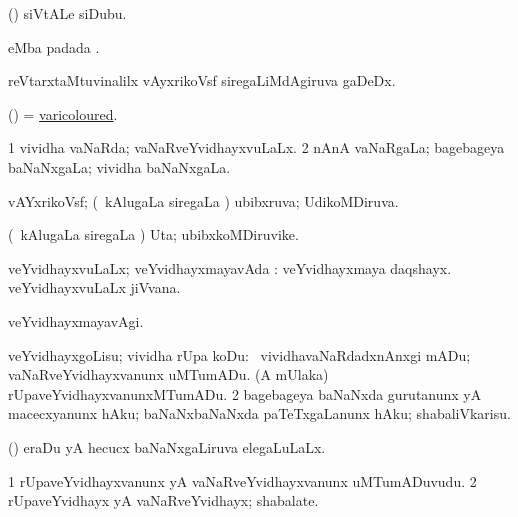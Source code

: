 \bentry
{} 
\gl{\nA}
\expl{}
\bmng
 (\veYshA) siVtALe siDubu. 
\emng
\eentry

\bentry
{} 
\gl{\nA}
\bmng
  eMba padada \bava. 
\emng
\eentry

\bentry
{} 
\gl{\nA}
\expl{}
\bmng
 reVtarxtaMtuvinalilx vAyxrikoVsf siregaLiMdAgiruva gaDeDx. 
\emng
\eentry

\bentry
{} 
\gl{\gu}
\expl{}
\bmng
 (\ame) = \hyperlink{varicoloured}{varicoloured}. 
\emng
\eentry

\bentry
{} 
\gl{\gu}
\expl{}
\bmng
\bnum
\num{1} vividha vaNaRda; vaNaRveYvidhayxvuLaLx. 
\num{2} nAnA vaNaRgaLa; bagebageya baNaNxgaLa; vividha baNaNxgaLa. 
\enum
\emng
\eentry

\bentry
{} 
\gl{\gu}
\expl{}
\bmng
 vAYxrikoVsf; (\kanmu\ kAlugaLa siregaLa \vi) ubibxruva; UdikoMDiruva. 
\emng
\eentry

\bentry
{} 
\gl{\nA}
\expl{}
\bmng
 (\kanmu\ kAlugaLa siregaLa \vi) Uta; ubibxkoMDiruvike. 
\emng
\eentry

\bentry
{} 
\gl{\gu}
\expl{}
\bmng
 veYvidhayxvuLaLx; veYvidhayxmayavAda :  veYvidhayxmaya daqshayx.  veYvidhayxvuLaLx jiVvana. 
\emng
\eentry

\bentry
{} 
\gl{\kirxvi}
\expl{}
\bmng
 veYvidhayxmayavAgi. 
\emng
\eentry

\bentry
{} 
\gl{\sakirx}
\expl{}
\bmng
\bnum
{} veYvidhayxgoLisu; vividha rUpa koDu: 
\banum
{} \kanmu\ vividhavaNaRdadxnAnxgi mADu; vaNaRveYvidhayxvanunx uMTumADu. 
 (A mUlaka) rUpaveYvidhayxvanunxMTumADu. 
\eanum
\numie
\num{2} bagebageya baNaNxda gurutanunx yA macecxyanunx hAku; baNaNxbaNaNxda paTeTxgaLanunx hAku; shabaliVkarisu. 
\enum
\emng
\eentry

\bentry
{} 
\gl{\gu}
\expl{}
\bmng
 (\savi) eraDu yA hecucx baNaNxgaLiruva elegaLuLaLx. 
\emng
\eentry

\bentry
{} 
\gl{\nA}
\expl{}
\bmng
\bnum
\num{1} rUpaveYvidhayxvanunx yA vaNaRveYvidhayxvanunx uMTumADuvudu. 
\num{2} rUpaveYvidhayx yA vaNaRveYvidhayx; shabalate. 
\enum
\emng
\eentry

